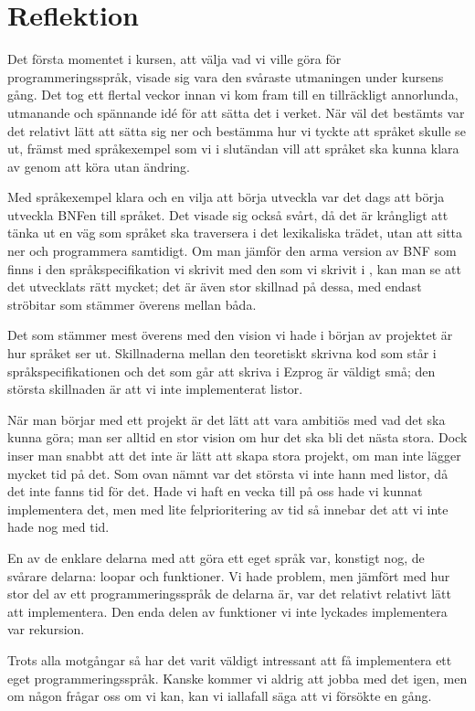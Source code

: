 \documentclass{TDP003mall}
\begin{document}
{\section{Reflektion}
Det första momentet i kursen, att välja vad vi ville göra för programmeringsspråk, visade sig vara den svåraste utmaningen under kursens gång. Det tog ett flertal veckor innan vi kom fram till en tillräckligt annorlunda, utmanande och spännande idé för att sätta det i verket. När väl det bestämts var det relativt lätt att sätta sig ner och bestämma hur vi tyckte att språket skulle se ut, främst med språkexempel som vi i slutändan vill att språket ska kunna klara av genom att köra utan ändring.

Med språkexempel klara och en vilja att börja utveckla var det dags att börja utveckla BNFen till språket. Det visade sig också svårt, då det är krångligt att tänka ut en väg som språket ska traversera i det lexikaliska trädet, utan att sitta ner och programmera samtidigt. Om man jämför den arma version av BNF som finns i den språkspecifikation vi skrivit med den som vi skrivit i , kan man se att det utvecklats rätt mycket; det är även stor skillnad på dessa, med endast ströbitar som stämmer överens mellan båda.

Det som stämmer mest överens med den vision vi hade i början av projektet är hur språket ser ut. Skillnaderna mellan den teoretiskt skrivna kod som står i språkspecifikationen och det som går att skriva i Ezprog är väldigt små; den största skillnaden är att vi inte implementerat listor.

När man börjar med ett projekt är det lätt att vara ambitiös med vad det ska kunna göra; man ser alltid en stor vision om hur det ska bli det nästa stora. Dock inser man snabbt att det inte är lätt att skapa stora projekt, om man inte lägger mycket tid på det. Som ovan nämnt var det största vi inte hann med listor, då det inte fanns tid för det. Hade vi haft en vecka till på oss hade vi kunnat implementera det, men med lite felprioritering av tid så innebar det att vi inte hade nog med tid.

En av de enklare delarna med att göra ett eget språk var, konstigt nog, de svårare delarna: loopar och funktioner. Vi hade problem, men jämfört med hur stor del av ett programmeringsspråk de delarna är, var det relativt relativt lätt att implementera. Den enda delen av funktioner vi inte lyckades implementera var rekursion.

Trots alla motgångar så har det varit väldigt intressant att få implementera ett eget programmeringsspråk. Kanske kommer vi aldrig att jobba med det igen, men om någon frågar oss om vi kan, kan vi iallafall säga att vi försökte en gång.
\clearpage
}
\end{document}

